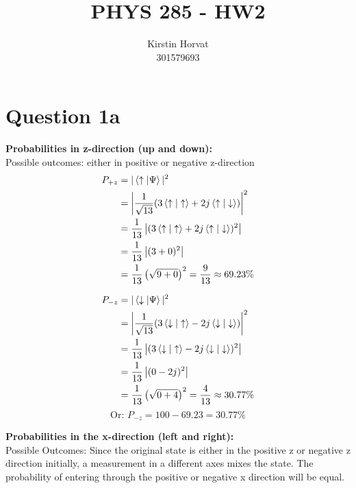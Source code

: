 \documentclass[12pt]{article}
\title{PHYS 285 - HW2}
\author{Kirstin Horvat \\ \small{301579693}}
\begin{document}
\maketitle
\onehalfspacing


\section*{Question 1a}
\textbf{Probabilities in z-direction (up and down):} \\
Possible outcomes: either in positive or negative z-direction
\begin{equation}
    \begin{split}
        P_{+z} &= |\braket{ \uparrow | \Psi}|^{2} \\
        &= \left| \frac{1}{\sqrt{13}}(3\braket{\uparrow | \uparrow} + 2j\braket{\uparrow | \downarrow})\right|^2 \\
        &= \frac{1}{13}\left|(3\braket{\uparrow | \uparrow} + 2j\braket{\uparrow | \downarrow})^{2}\right| \\
        &= \frac{1}{13}\left|(3 + 0)^{2}\right| \\
        &= \frac{1}{13}\left(\sqrt{9 + 0}\right)^{2} = \frac{9}{13} \approx 69.23\% \\
    \end{split}
\end{equation}


\begin{equation}
    \begin{split}
        P_{-z} &= |\braket{ \downarrow | \Psi}|^{2} \\
        &= \left|\frac{1}{\sqrt{13}}(3\braket{\downarrow | \uparrow} - 2j\braket{\downarrow | \downarrow})\right|^2 \\
        &= \frac{1}{13}\left|(3\braket{\downarrow | \uparrow} - 2j\braket{\downarrow | \downarrow})^{2}\right| \\ 
        &= \frac{1}{13}\left|(0 - 2j)^{2}\right| \\ 
        &= \frac{1}{13}\left(\sqrt{0 + 4}\right)^{2} = \frac{4}{13} \approx 30.77\% \\
    \end{split}
\end{equation}
\[
\text{Or: } P_{-z} = 100 - 69.23 = 30.77\%
\]

\newpage

\raggedright
\textbf{Probabilities in the x-direction (left and right):} \\
Possible Outcomes: Since the original state is either in the positive z or negative z direction initially, a measurement in a different axes mixes the state. The probability of entering through the positive or negative x direction will be equal.
\end{document}
